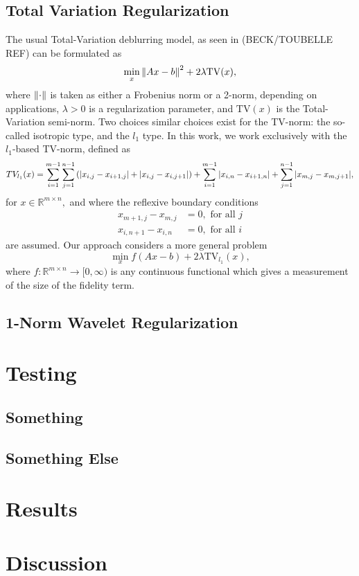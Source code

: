 \documentclass[10pt,a4paper]{article}
\newcommand{\R}{\mathbb{R}}
\begin{document}
\subsection{Total Variation Regularization}
The usual Total-Variation deblurring model, as seen in (BECK/TOUBELLE REF) can be formulated as 
\begin{equation} \label{tv_orig}
\min_{x} \norm{ Ax - b }^2 + 2 \lambda \mathrm{TV}(x),
\end{equation}
where $\norm{\cdot}$ is taken as either a Frobenius norm or a 2-norm, depending on applications,  $\lambda>0$ is a regularization parameter, and $\mathrm{TV}(x)$ is the Total-Variation semi-norm. Two choices similar choices exist for the TV-norm: the so-called isotropic type, and the $l_1$ type. In this work, we work exclusively with the $l_1$-based TV-norm, defined as 
$$ TV_{l_1}(x) = \sum_{i=1}^{m-1} \sum_{j=1}^{n-1} \left( \abs{x_{i,j}  - x_{i+1,j} } + \abs{ x_{i,j} - x_{i,j+1}  } \right) + \sum_{i=1}^{m-1} \abs{ x_{i,n} - x_{i+1,n} } + \sum_{j=1}^{n-1} \abs{ x_{m,j} - x_{m,j+1 } },$$ for $x \in \R^{m \times n},$ and where the reflexive boundary conditions
\begin{align*}
x_{m+1,j} - x_{m,j} &= 0, \textrm{ for all }j \\
 x_{i,n+1} - x_{i,n} &= 0, \textrm{ for all }i
\end{align*}
are assumed. Our approach considers a more general problem
\begin{equation} \label{tv_ours}
\min_{x} f(Ax - b ) + 2 \lambda \mathrm{TV}_{l_1}(x),
\end{equation}
where $f: \R^{m \times n} \rightarrow [0,\infty)$ is any continuous functional which gives a measurement of the size of the fidelity term.


\subsection{1-Norm Wavelet Regularization}


\section{Testing}

\subsection{Something}


\subsection{Something Else}



\section{Results}

\section{Discussion}



\end{document}
